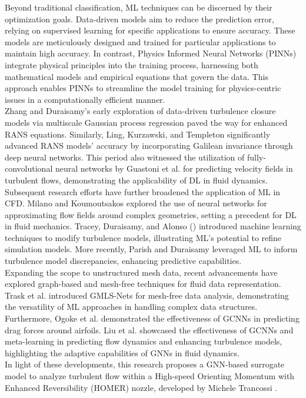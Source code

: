 Beyond traditional classification, ML techniques can be discerned by their optimization goals. Data-driven models aim to reduce the prediction error, relying on supervised learning for specific applications to ensure accuracy. These models are meticulously designed and trained for particular applications to maintain high accuracy. In contrast, Physics Informed Neural Networks (PINNs) \cite{raissi2019physics} integrate physical principles into the training process, harnessing both mathematical models and empirical equations that govern the data. This approach enables PINNs to streamline the model training for physics-centric issues in a computationally efficient manner. \\
Zhang and Duraisamy’s early exploration \cite{zhang2015} of data-driven turbulence closure models via multiscale Gaussian process regression paved the way for enhanced RANS equations. Similarly, Ling, Kurzawski, and Templeton \cite{ling2016} significantly advanced RANS models' accuracy by incorporating Galilean invariance through deep neural networks. This period also witnessed the utilization of fully-convolutional neural networks by Guastoni et al. \cite{guastoni2020} for predicting velocity fields in turbulent flows, demonstrating the applicability of DL in fluid dynamics.\\
Subsequent research efforts have further broadened the application of ML in CFD. Milano and Koumoutsakos \cite{milano2002} explored the use of neural networks for approximating flow fields around complex geometries, setting a precedent for DL in fluid mechanics. Tracey, Duraisamy, and Alonso (\cite{tracey2013}) introduced machine learning techniques to modify turbulence models, illustrating ML's potential to refine simulation models. More recently, Parish and Duraisamy \cite{parish2016} leveraged ML to inform turbulence model discrepancies, enhancing predictive capabilities.\\
Expanding the scope to unstructured mesh data, recent advancements have explored graph-based and mesh-free techniques for fluid data representation. Trask et al. \cite{trask2019} introduced GMLS-Nets for mesh-free data analysis, demonstrating the versatility of ML approaches in handling complex data structures. Furthermore, Ogoke et al. \cite{ogoke2020} demonstrated the effectiveness of GCNNs in predicting drag forces around airfoils. Liu et al. \cite{metalearning} showcased the effectiveness of GCNNs and meta-learning in predicting flow dynamics and enhancing turbulence models, highlighting the adaptive capabilities of GNNs in fluid dynamics.\\
In light of these developments, this research proposes a \gls{GNN}-based surrogate model to analyze turbulent flow within a High-speed Orienting Momentum with Enhanced Reversibility (HOMER) nozzle, developed by Michele Trancossi \cite{trandum}.

